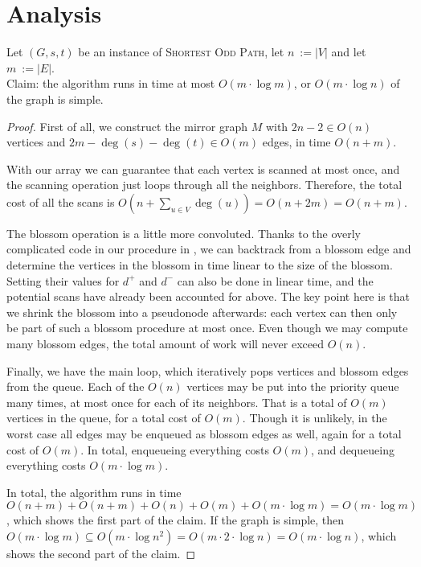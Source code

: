 \section{Analysis}
\begin{theorem}
    Let $(G,s,t)$ be an instance of \textsc{Shortest Odd Path}, let $n~:= |V|$ and let $m~:= |E|$. \\
    Claim: the algorithm runs in time at most $O(m \cdot \log m)$, or $O(m \cdot \log n)$ of the graph is simple.
    \begin{proof}  
        First of all, we construct the mirror graph $M$ with $2n-2 \in O(n)$ vertices and $2m - \deg(s) - \deg(t) \in O(m)$ edges, in time $O(n+m)$.
        
        With our  array we can guarantee that each vertex is scanned at most once, and the scanning operation just loops through all the neighbors. Therefore, the total cost of all the scans is $O(n + \sum_{u \in V} \deg(u)) = O(n + 2m) = O(n + m)$.
    
        The blossom operation is a little more convoluted. Thanks to the overly complicated code in our  procedure in , we can backtrack from a blossom edge and determine the vertices in the blossom in time linear to the size of the blossom. Setting their values for $d^+$ and $d^-$ can also be done in linear time, and the potential scans have already been accounted for above. The key point here is that we shrink the blossom into a pseudonode afterwards: each vertex can then only be part of such a blossom procedure at most once. Even though we may compute many blossom edges, the total amount of work will never exceed $O(n)$.
    
        Finally, we have the main loop, which iteratively pops vertices and blossom edges from the queue. Each of the $O(n)$ vertices may be put into the priority queue many times, at most once for each of its neighbors. That is a total of $O(m)$ vertices in the queue, for a total cost of $O(m)$. Though it is unlikely, in the worst case all edges may be enqueued as blossom edges as well, again for a total cost of $O(m)$. In total, enqueueing everything costs $O(m)$, and dequeueing everything costs $O(m \cdot \log m)$.
    
        In total, the algorithm runs in time $O(n+m) + O(n+m) + O(n) + O(m) + O(m \cdot \log m) = O(m \cdot \log m)$, which shows the first part of the claim. If the graph is simple, then $O(m \cdot \log m) \subseteq O(m \cdot \log n^2) = O(m \cdot 2 \cdot \log n) = O(m \cdot \log n)$, which shows the second part of the claim.
    \end{proof}        
\end{theorem}


